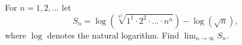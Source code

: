 For \(n = 1, 2, \ldots\) let
\[
S_n = \log\!\left(\sqrt[n^2]{1^1 \cdot 2^2 \cdot \ldots \cdot n^n}\right) - \log(\sqrt{n}),
\]
where \(\log\) denotes the natural logarithm. Find \(\displaystyle\lim_{n \to \infty} S_n\).
